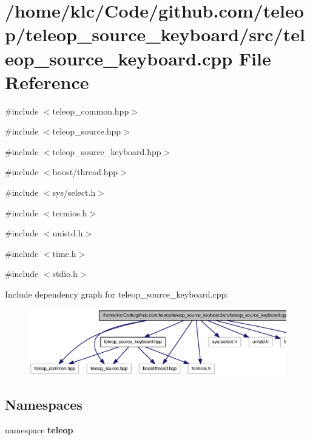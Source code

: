 \section{/home/klc/Code/github.com/teleop/teleop\_\-source\_\-keyboard/src/teleop\_\-source\_\-keyboard.cpp File Reference}
\label{teleop__source__keyboard_8cpp}
{\ttfamily \#include $<$teleop\_\-common.hpp$>$}\par
{\ttfamily \#include $<$teleop\_\-source.hpp$>$}\par
{\ttfamily \#include $<$teleop\_\-source\_\-keyboard.hpp$>$}\par
{\ttfamily \#include $<$boost/thread.hpp$>$}\par
{\ttfamily \#include $<$sys/select.h$>$}\par
{\ttfamily \#include $<$termios.h$>$}\par
{\ttfamily \#include $<$unistd.h$>$}\par
{\ttfamily \#include $<$time.h$>$}\par
{\ttfamily \#include $<$stdio.h$>$}\par
Include dependency graph for teleop\_\-source\_\-keyboard.cpp:
\nopagebreak
\begin{figure}[H]
\begin{center}
\leavevmode
\includegraphics[width=400pt]{teleop__source__keyboard_8cpp__incl}
\end{center}
\end{figure}
\subsection*{Namespaces}
\begin{DoxyCompactItemize}
\item 
namespace {\bf teleop}
\end{DoxyCompactItemize}
